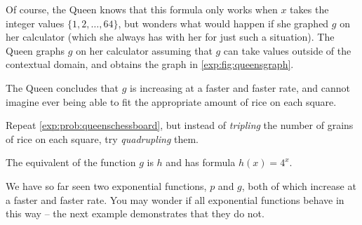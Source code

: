 \begin{pccexample}
	Of course, the Queen knows that this formula only works when $x$ takes the 
	integer values $\{1,2,\ldots,64\}$, but wonders what would happen if 
	she graphed $g$ on her calculator (which she always has with her for just 
	such a situation). The Queen graphs $g$ on her calculator assuming 
	that $g$ can take values outside of the contextual domain, and 
	obtains the graph in \cref{exp:fig:queensgraph}.
							
	The Queen concludes that $g$ is increasing at a faster and faster rate, and 
	cannot imagine ever being able to fit the appropriate amount of rice on 
	each square.
\end{pccexample}
\begin{doyouunderstand}
	\begin{problem}
	Repeat \cref{exp:prob:queenschessboard}, but instead of \emph{tripling} the 
	number of grains of rice on each square, try \emph{quadrupling} them.
	\begin{shortsolution}
		The equivalent of the function $g$ is $h$ and has formula $h(x)=4^x$.
	\end{shortsolution}
	\end{problem}
\end{doyouunderstand}
We have so far seen two exponential functions, $p$ and $g$, both of which increase 
at a faster and faster rate. You may wonder if all exponential functions behave in this way --
the next example demonstrates that they do not.

